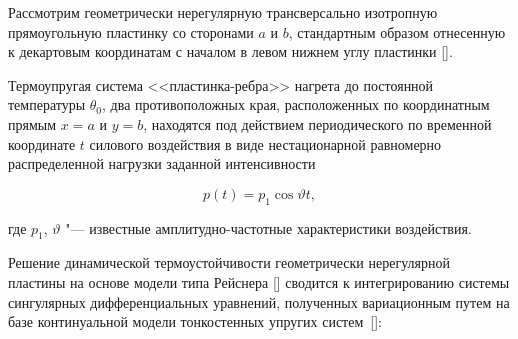 





\renewcommand{\JournalDataOnline}{\displaydate{mylce}}




\makerutitle


















Рассмотрим геометрически нерегулярную трансверсально изотропную прямоугольную пластинку со сторонами $a$ и $b$, стандартным образом отнесенную к декартовым координатам с началом в левом нижнем углу пластинки [].

Термоупругая система <<пластинка-ребра>> нагрета до постоянной температуры $\theta_0$, два противоположных края, расположенных по координатным прямым $x=a$ и $y=b$, находятся под действием периодического по временной координате $t$ силового воздействия в виде нестационарной равномерно распределенной нагрузки заданной интенсивности

\begin{equation}\label{eq:myl:f01}

    p(t)=p_1 \cos \vartheta t,

\end{equation}

где $p_1$, $\vartheta$ "--- известные амплитудно-частотные характеристики воздействия. 

Решение динамической термоустойчивости геометрически нерегулярной пластины на основе модели типа Рейснера [] сводится к интегрированию системы сингулярных дифференциальных уравнений, полученных вариационным путем на базе континуальной модели тонкостенных упругих систем~[]:


